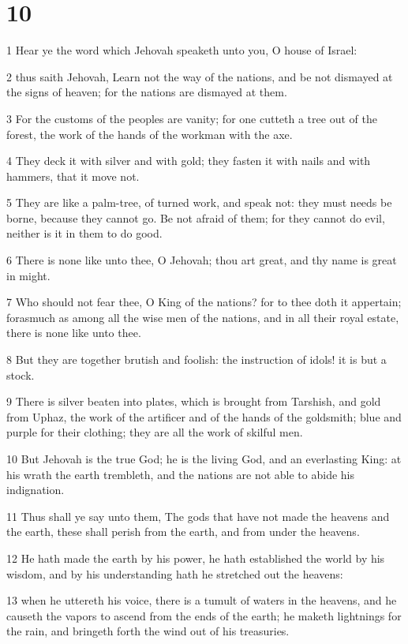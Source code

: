 \chapter{10}

\par 1 Hear ye the word which Jehovah speaketh unto you, O house of Israel:
\par 2 thus saith Jehovah, Learn not the way of the nations, and be not dismayed at the signs of heaven; for the nations are dismayed at them.
\par 3 For the customs of the peoples are vanity; for one cutteth a tree out of the forest, the work of the hands of the workman with the axe.
\par 4 They deck it with silver and with gold; they fasten it with nails and with hammers, that it move not.
\par 5 They are like a palm-tree, of turned work, and speak not: they must needs be borne, because they cannot go. Be not afraid of them; for they cannot do evil, neither is it in them to do good.
\par 6 There is none like unto thee, O Jehovah; thou art great, and thy name is great in might.
\par 7 Who should not fear thee, O King of the nations? for to thee doth it appertain; forasmuch as among all the wise men of the nations, and in all their royal estate, there is none like unto thee.
\par 8 But they are together brutish and foolish: the instruction of idols! it is but a stock.
\par 9 There is silver beaten into plates, which is brought from Tarshish, and gold from Uphaz, the work of the artificer and of the hands of the goldsmith; blue and purple for their clothing; they are all the work of skilful men.
\par 10 But Jehovah is the true God; he is the living God, and an everlasting King: at his wrath the earth trembleth, and the nations are not able to abide his indignation.
\par 11 Thus shall ye say unto them, The gods that have not made the heavens and the earth, these shall perish from the earth, and from under the heavens.
\par 12 He hath made the earth by his power, he hath established the world by his wisdom, and by his understanding hath he stretched out the heavens:
\par 13 when he uttereth his voice, there is a tumult of waters in the heavens, and he causeth the vapors to ascend from the ends of the earth; he maketh lightnings for the rain, and bringeth forth the wind out of his treasuries.
